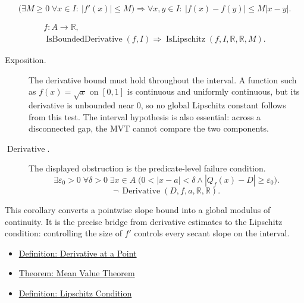 \begin{remark*}
\[
  \bigl(\exists M\geq 0\;\forall x\in I:\ |f'(x)|\leq M\bigr)
  \Longrightarrow
  \forall x,y\in I:\ |f(x)-f(y)|\leq M|x-y|.
\]
\end{remark*}

\begin{remark*}
\[
\begin{aligned}
  f\colon A\to\mathbb{R},\\
  \operatorname{IsBoundedDerivative}(f,I)
  \Longrightarrow
  \operatorname{IsLipschitz}(f,I,\mathbb{R},\mathbb{R},M).
\end{aligned}
\]
\end{remark*}

\begin{remark*}
\begin{description}
  \item[Exposition.]
The derivative bound must hold throughout the interval. A function such as \(f(x)=\sqrt{x}\) on \([0,1]\) is continuous and uniformly continuous, but its derivative is unbounded near \(0\), so no global Lipschitz constant follows from this test. The interval hypothesis is also essential: across a disconnected gap, the MVT cannot compare the two components.


  \item[\(\operatorname{Derivative}.\)]
  The displayed obstruction is the predicate-level failure condition.
  \[
  \exists\varepsilon_0>0\;\forall\delta>0\;\exists x\in A\;\bigl(0<|x-a|<\delta\land |Q_f(x)-D|\ge\varepsilon_0\bigr).
  \]
  \[
  \neg\,\operatorname{Derivative}(D,f,a,\mathbb{R},\mathbb{R}).
  \]
\end{description}
\end{remark*}

\begin{remark*}[Interpretation]
This corollary converts a pointwise slope bound into a global modulus of continuity. It is the precise bridge from derivative estimates to the Lipschitz condition: controlling the size of \(f'\) controls every secant slope on the interval.
\end{remark*}

\begin{dependencies}
\begin{itemize}
  \item \hyperref[def:derivative-at-a-point]{Definition: Derivative at a Point}
  \item \hyperref[thm:mean-value-theorem]{Theorem: Mean Value Theorem}
  \item \hyperref[def:lipschitz-condition]{Definition: Lipschitz Condition}
\end{itemize}
\end{dependencies}
